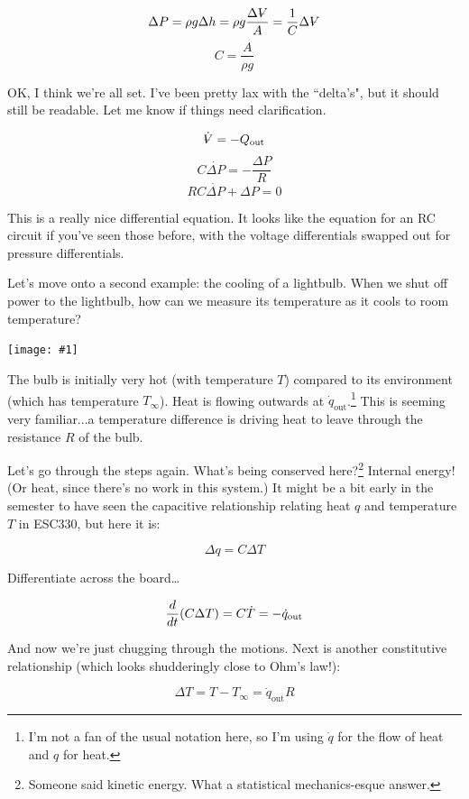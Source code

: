 \documentclass{article}
\newcommand{\Volume}{{\ooalign{\hfil$V$\hfil\cr\kern0.08em--\hfil\cr}}}
\newcommand{\bicture}[1]{
\begin{center}
    {\texttt{[image: \#1]}}
\end{center}}
\begin{document}
\begin{onehalfspacing}
\begin{flushleft}
\[\Delta P = \rho g \Delta h = \rho g \frac{\Delta \Volume}{A} = \frac{1}{C} \Delta \Volume\]
\[C = \frac{A}{\rho g}\]

OK, I think we're all set. I've been pretty lax with the ``delta's", but it should still be readable. Let me know if things need clarification.

\[\dot{\Volume} = -Q_\text{out}\]
\[C \dot{\Delta P} = - \frac{\Delta P}{R}\]
\[\boxed{RC \dot{\Delta P} + {\Delta P} = 0}\]

This is a really nice differential equation. It looks like the equation for an RC circuit if you've seen those before, with the voltage differentials swapped out for pressure differentials.

\medskip

Let's move onto a second example: the cooling of a lightbulb. When we shut off power to the lightbulb, how can we measure its temperature as it cools to room temperature?

\bicture{1_sys2}

The bulb is initially very hot (with temperature \(T\)) compared to its environment (which has temperature \(T_\infty\)). Heat is flowing outwards at \(\dot{q}_\text{out}\).\footnote{I'm not a fan of the usual notation here, so I'm using \(\dot{q}\) for the flow of heat and \(q\) for heat.} This is seeming very familiar...a temperature difference is driving heat to leave through the resistance \(R\) of the bulb.

\medskip

Let's go through the steps again. What's being conserved here?\footnote{Someone said kinetic energy. What a statistical mechanics-esque answer.} Internal energy! (Or heat, since there's no work in this system.) It might be a bit early in the semester to have seen the capacitive relationship relating heat \(q\) and temperature \(T\) in ESC330, but here it is:

\vspace{-0.1in}
\[\Delta q = C \Delta T\]

Differentiate across the board\dots

\vspace{-0.1in}
\[\frac{d}{dt} \qty(C \Delta T) = C\dot{T} = -\dot{q}_\text{out}\]

And now we're just chugging through the motions. Next is another constitutive relationship (which looks shudderingly close to Ohm's law!):

\vspace{-0.1in}
\[\Delta T = T - T_\infty = \dot{q}_\text{out} R\]


\end{flushleft}
\end{onehalfspacing}
\end{document}
